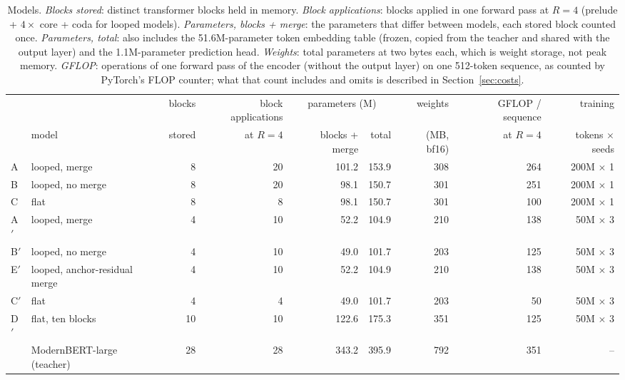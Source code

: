 \documentclass[11pt]{article}
\begin{document}
\begin{table}[t]
\centering
\small
\begin{adjustbox}{max width=\linewidth}
\begin{tabular}{llrrrrrrr}
\toprule
& & blocks & block applications & \multicolumn{2}{c}{parameters (M)} & weights & GFLOP / sequence & training \\
\cmidrule(lr){5-6}
& model & stored & at $R = 4$ & blocks + merge & total & (MB, bf16) & at $R = 4$ & tokens $\times$ seeds \\
\midrule
A & looped, merge & 8 & 20 & 101.2 & 153.9 & 308 & 264 & 200M $\times$ 1 \\
B & looped, no merge & 8 & 20 & 98.1 & 150.7 & 301 & 251 & 200M $\times$ 1 \\
C & flat & 8 & 8 & 98.1 & 150.7 & 301 & 100 & 200M $\times$ 1 \\
\midrule
A$'$ & looped, merge & 4 & 10 & 52.2 & 104.9 & 210 & 138 & 50M $\times$ 3 \\
B$'$ & looped, no merge & 4 & 10 & 49.0 & 101.7 & 203 & 125 & 50M $\times$ 3 \\
E$'$ & looped, anchor-residual merge & 4 & 10 & 52.2 & 104.9 & 210 & 138 & 50M $\times$ 3 \\
C$'$ & flat & 4 & 4 & 49.0 & 101.7 & 203 & 50 & 50M $\times$ 3 \\
D$'$ & flat, ten blocks & 10 & 10 & 122.6 & 175.3 & 351 & 125 & 50M $\times$ 3 \\
\midrule
& ModernBERT-large (teacher) & 28 & 28 & 343.2 & 395.9 & 792 & 351 & -- \\
\bottomrule
\end{tabular}
\end{adjustbox}
\caption{Models. \emph{Blocks stored}: distinct transformer blocks held in memory. \emph{Block applications}: blocks applied in one forward
pass at $R = 4$ (prelude + $4\times$ core + coda for looped models). \emph{Parameters, blocks + merge}: the parameters that differ between
models, each stored block counted once. \emph{Parameters, total}: also includes the 51.6M-parameter token embedding table (frozen, copied from the
teacher and shared with the output layer) and the 1.1M-parameter prediction head. \emph{Weights}: total parameters at two bytes each, which is
weight storage, not peak memory. \emph{GFLOP}: operations of one forward pass of the encoder (without the output layer) on one 512-token
sequence, as counted by PyTorch's FLOP counter; what that count includes and omits is described in Section~\ref{sec:costs}.}
\label{tab:arms}
\end{table}
\end{document}
